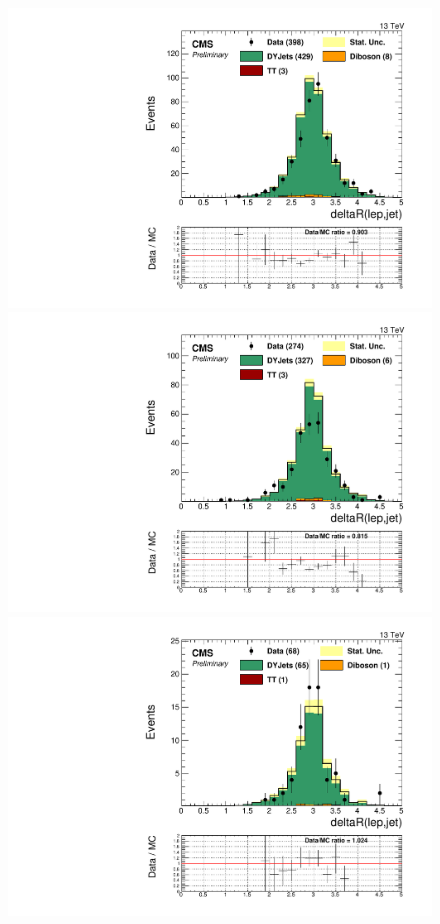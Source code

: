 \begin{figure}[h]
\begin{center}
\includegraphics[scale=0.37]{figures/control/deltaRlepjetMLP.pdf}
\includegraphics[scale=0.37]{figures/control/deltaRlepjetELP.pdf}\\[2cm]
\includegraphics[scale=0.37]{figures/control/deltaRlepjetMHP.pdf}

\end{center}
\end{figure}
